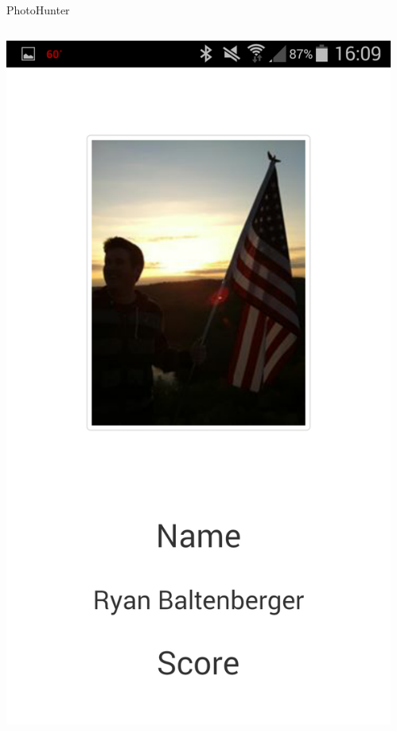 \documentclass[aspectratio=169]{beamer}
\begin{document}
\begin{frame}{PhotoHunter}
\begin{columns}[c]
\begin{column}{0.3\columnwidth}
      \includegraphics[width=\textwidth,height=\textheight,keepaspectratio]{photohunter/user}
    \end{column}
    \begin{column}{0.3\columnwidth}
      \centering

\end{column}
\end{columns}
\end{frame}
\end{document}
